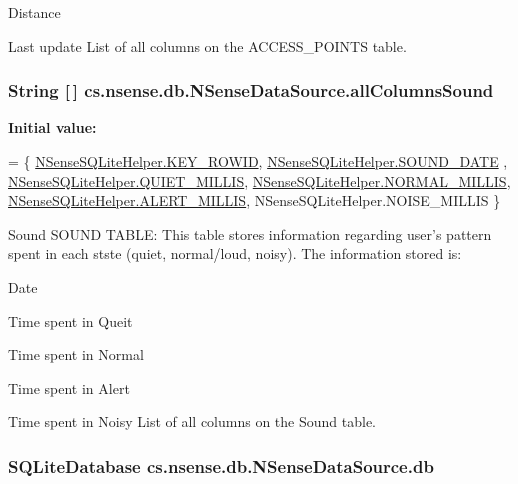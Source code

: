 Distance
\begin{DoxyItemize}
\item Last update List of all columns on the A\-C\-C\-E\-S\-S\-\_\-\-P\-O\-I\-N\-T\-S table. 
\end{DoxyItemize}\hypertarget{classcs_1_1nsense_1_1db_1_1_n_sense_data_source_a512871cef56b7d4613d79f722aa60593}{
\subsubsection[{all\-Columns\-Sound}]{\setlength{\rightskip}{0pt plus 5cm}String \mbox{[}$\,$\mbox{]} cs.\-nsense.\-db.\-N\-Sense\-Data\-Source.\-all\-Columns\-Sound}}\label{classcs_1_1nsense_1_1db_1_1_n_sense_data_source_a512871cef56b7d4613d79f722aa60593}
{\bfseries Initial value\-:}
\begin{DoxyCode}
= \{ 
            \hyperlink{classcs_1_1nsense_1_1db_1_1_n_sense_s_q_lite_helper_a98ac608a28955ac678219d9eada34781}{NSenseSQLiteHelper.KEY\_ROWID},
            \hyperlink{classcs_1_1nsense_1_1db_1_1_n_sense_s_q_lite_helper_aa06cac21fc74b8e6402ab0d38b2d6b06}{NSenseSQLiteHelper.SOUND\_DATE} ,
            \hyperlink{classcs_1_1nsense_1_1db_1_1_n_sense_s_q_lite_helper_aca4c16641d87e464e37b4649a2b643fe}{NSenseSQLiteHelper.QUIET\_MILLIS},
            \hyperlink{classcs_1_1nsense_1_1db_1_1_n_sense_s_q_lite_helper_a40a1401dfe12d12ab47792eb901d7783}{NSenseSQLiteHelper.NORMAL\_MILLIS},
            \hyperlink{classcs_1_1nsense_1_1db_1_1_n_sense_s_q_lite_helper_ab8fbad09e9e02a101ab3ba52048933d3}{NSenseSQLiteHelper.ALERT\_MILLIS},
            NSenseSQLiteHelper.NOISE\_MILLIS
    \}
\end{DoxyCode}
Sound S\-O\-U\-N\-D T\-A\-B\-L\-E\-: This table stores information regarding user's pattern spent in each stste (quiet, normal/loud, noisy). The information stored is\-:
\begin{DoxyItemize}
\item Date
\item Time spent in Queit
\item Time spent in Normal
\item Time spent in Alert
\item Time spent in Noisy List of all columns on the Sound table. 
\end{DoxyItemize}\hypertarget{classcs_1_1nsense_1_1db_1_1_n_sense_data_source_aa0c89ba4ca2b5ad8ba3e7edbe0379a2c}{
\subsubsection[{db}]{\setlength{\rightskip}{0pt plus 5cm}S\-Q\-Lite\-Database cs.\-nsense.\-db.\-N\-Sense\-Data\-Source.\-db\hspace{0.3cm}{\ttfamily [private]}}}\label{classcs_1_1nsense_1_1db_1_1_n_sense_data_source_aa0c89ba4ca2b5ad8ba3e7edbe0379a2c}
